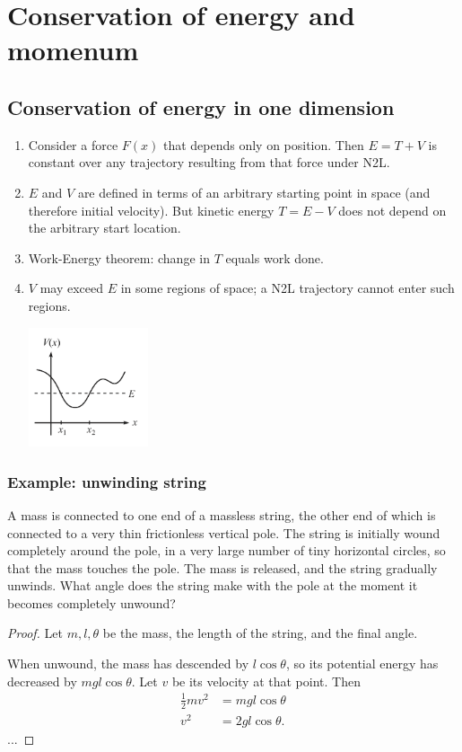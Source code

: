 \section{Conservation of energy and momenum}
\subsection{Conservation of energy in one dimension}

\begin{enumerate}
\item Consider a force $F(x)$ that depends only on position. Then $E = T + V$ is constant over any
  trajectory resulting from that force under N2L.
\item $E$ and $V$ are defined in terms of an arbitrary starting point in space (and therefore
  initial velocity). But kinetic energy $T = E - V$ does not depend on the arbitrary start location.
\item Work-Energy theorem: change in $T$ equals work done.
\item $V$ may exceed $E$ in some regions of space; a N2L trajectory cannot enter such regions.
  \begin{mdframed}
    \includegraphics[width=100pt]{img/physics--classical-mechanics--morin--V-E-landscape.png}
  \end{mdframed}
\end{enumerate}

\subsubsection{Example: unwinding string}
A mass is connected to one end of a massless string, the other end of which is connected to a very
thin frictionless vertical pole. The string is initially wound completely around the pole, in a very
large number of tiny horizontal circles, so that the mass touches the pole. The mass is released,
and the string gradually unwinds. What angle does the string make with the pole at the moment it
becomes completely unwound?

\begin{proof}
  Let $m, l, \theta$ be the mass, the length of the string, and the final angle.

  When unwound, the mass has descended by $l\cos\theta$, so its potential energy has decreased by
  $mgl\cos\theta$. Let $v$ be its velocity at that point. Then
  \begin{align*}
    \frac{1}{2}mv^2 &= mgl\cos\theta\\
    v^2             &= 2gl\cos\theta.
  \end{align*}
  ...
\end{proof}

